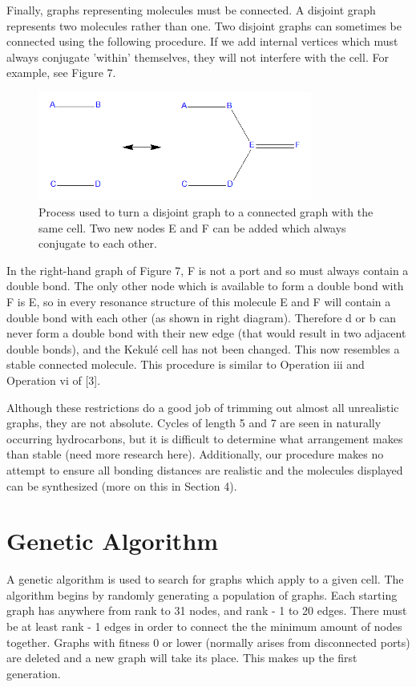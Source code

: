 \documentclass[12pt]{article}
\begin{document}
Finally, graphs representing molecules must be connected. A disjoint graph represents two molecules rather than one. Two disjoint graphs can sometimes be connected using the following procedure. If we add internal vertices which must always conjugate ’within’ themselves, they will not interfere with the cell. For example, see Figure 7.

\begin{figure}[ht!]
\centering
\includegraphics[width=90mm]{disjoint2.png}
\caption{Process used to turn a disjoint graph to a connected graph with the same cell. Two new nodes E and F can be added which always conjugate to each other.}
\end{figure}

In the right-hand graph of Figure 7, F is not a port and so must always contain a double bond. The only other node which is available to form a double bond with F is E, so in every resonance structure of this molecule E and F will contain a double bond with each other (as shown in right diagram). Therefore d or b can never form a double bond with their new edge (that would result in two adjacent double bonds), and the Kekul\'e cell has not been changed. This now resembles a stable connected molecule. This procedure is similar to Operation iii and Operation vi of [3].

Although these restrictions do a good job of trimming out almost all unrealistic graphs, they are not absolute. Cycles of length 5 and 7 are seen in naturally occurring hydrocarbons, but it is difficult to determine what arrangement makes than stable (need more research here). Additionally, our procedure makes no attempt to ensure all bonding distances are realistic and the molecules displayed can be synthesized (more on this in Section 4). 

\section{Genetic Algorithm}

A genetic algorithm is used to search for graphs which apply to a given cell. The algorithm begins by randomly generating a population of graphs. Each starting graph has anywhere from rank to 31 nodes, and rank - 1 to 20 edges. There must be at least rank - 1 edges in order to connect the the minimum amount of nodes together. Graphs with fitness 0 or lower (normally arises from disconnected ports) are deleted and a new graph will take its place. This makes up the first generation.
\end{document}

